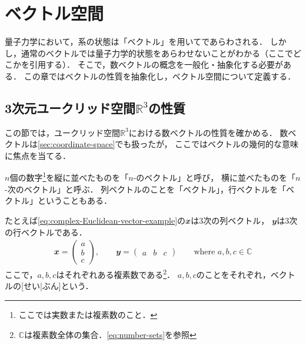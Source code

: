 \documentclass[../sotsu.tex]{subfiles}
\begin{document}
\section{ベクトル空間}
\label{sec:vector-space}

量子力学において，系の状態は「ベクトル」を用いてであらわされる．
しかし，通常のベクトルでは量子力学的状態をあらわせないことがわかる（ここでどこかを引用する）．
そこで，数ベクトルの概念を一般化・抽象化する必要がある．
この章ではベクトルの性質を抽象化し，ベクトル空間について定義する．


\subsection{3次元ユークリッド空間$ℝ^3$の性質}
\label{sec:Euclidean-vector-intro}

この節では，ユークリッド空間$ℝ^3$における数ベクトルの性質を確かめる．
数ベクトルは\cref{sec:coordinate-space}でも扱ったが，
ここではベクトルの幾何的な意味に焦点を当てる．

$n$個の数字\footnote{ここでは実数または複素数のこと．}を縦に並べたものを「$n$-のベクトル」と呼び，
横に並べたものを「$n$-次のベクトル」と呼ぶ\cite{miyake-lin-2008}．
列ベクトルのことを「ベクトル」，行ベクトルを「ベクトル」ということもある．

たとえば\cref{eq:complex-Euclidean-vector-example}の$𝒙$は3次の列ベクトル，
$𝒚$は3次の行ベクトルである．
\begin{align}
    \label{eq:complex-Euclidean-vector-example}
    𝒙 = 
    \begin{pmatrix}
        a  \\  b  \\  c
    \end{pmatrix}
    , \qquad
    𝒚 = 
    \begin{pmatrix}
        a  &  b  &  c
    \end{pmatrix}
    \qquad 
    \text{where $a, b, c ∈ ℂ$}
\end{align}
ここで，$a, b, c$はそれぞれある複素数である\footnote{$ℂ$は複素数全体の集合．\cref{eq:number-sets}を参照}．
$a, b, c$のことをそれぞれ，ベクトルの[せい|ぶん]という．
\end{document}
